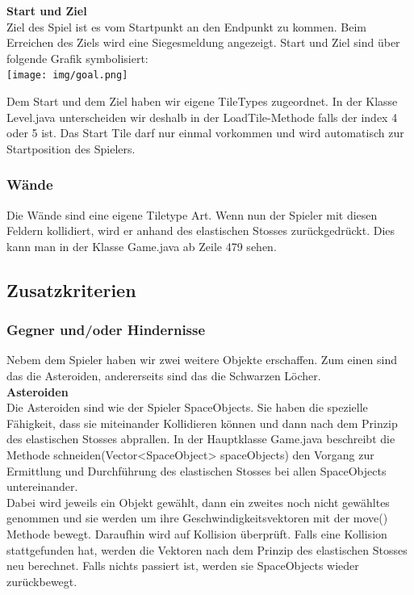 \documentclass[12pt,a4paper]{scrartcl}
\begin{document}
\textbf{Start und Ziel}\\
Ziel des Spiel ist es vom Startpunkt an den Endpunkt zu kommen. Beim Erreichen des Ziels wird eine Siegesmeldung
angezeigt. Start und Ziel sind über folgende Grafik symbolisiert:\\

\texttt{[image: img/goal.png]}

Dem Start und dem Ziel haben wir eigene TileTypes zugeordnet.
In der Klasse Level.java unterscheiden wir deshalb in der LoadTile-Methode falls der index 4 oder 5 ist.
Das Start Tile darf nur einmal vorkommen und wird automatisch zur Startposition des Spielers.

\subsubsection{Wände}
Die Wände sind eine eigene Tiletype Art.
Wenn nun der Spieler mit diesen Feldern kollidiert, wird er anhand des elastischen Stosses zurückgedrückt.
Dies kann man in der Klasse Game.java ab Zeile 479 sehen.

\subsection{Zusatzkriterien}

\subsubsection{Gegner und/oder Hindernisse}

Nebem dem Spieler haben wir zwei weitere Objekte erschaffen.
Zum einen sind das die Asteroiden, andererseits sind das die Schwarzen Löcher.		\\

\textbf{Asteroiden}		\\
Die Asteroiden sind wie der Spieler SpaceObjects. Sie haben die spezielle Fähigkeit, dass sie miteinander Kollidieren können und dann nach dem Prinzip des elastischen Stosses abprallen.
In der Hauptklasse Game.java beschreibt die Methode schneiden(Vector<SpaceObject> spaceObjects) den Vorgang zur Ermittlung und Durchführung des elastischen Stosses bei allen SpaceObjects untereinander. \\
Dabei wird jeweils ein Objekt gewählt, dann ein zweites noch nicht gewähltes genommen und sie werden um ihre Geschwindigkeitsvektoren mit der move() Methode bewegt. 
Daraufhin wird auf Kollision überprüft.
Falls eine Kollision stattgefunden hat, werden die Vektoren nach dem Prinzip des elastischen Stosses neu berechnet.
Falls nichts passiert ist, werden sie SpaceObjects wieder zurückbewegt.
\end{document}
